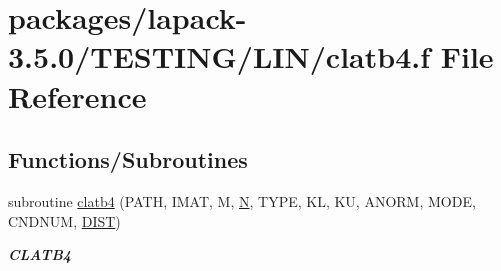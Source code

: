 \hypertarget{clatb4_8f}{}\section{packages/lapack-\/3.5.0/\+T\+E\+S\+T\+I\+N\+G/\+L\+I\+N/clatb4.f File Reference}
\label{clatb4_8f}
\subsection*{Functions/\+Subroutines}
\begin{DoxyCompactItemize}
\item 
subroutine \hyperlink{group__complex__lin_ga24ce60c916d0d1948c92c6cd574f4304}{clatb4} (P\+A\+T\+H, I\+M\+A\+T, M, \hyperlink{polmisc_8c_a0240ac851181b84ac374872dc5434ee4}{N}, T\+Y\+P\+E, K\+L, K\+U, A\+N\+O\+R\+M, M\+O\+D\+E, C\+N\+D\+N\+U\+M, \hyperlink{superlu__enum__consts_8h_af00a42ecad444bbda75cde1b64bd7e72ac04fbbdf0d80a4ad25e565541deeebd7}{D\+I\+S\+T})
\begin{DoxyCompactList}\small\item\em {\bfseries C\+L\+A\+T\+B4} \end{DoxyCompactList}\end{DoxyCompactItemize}
